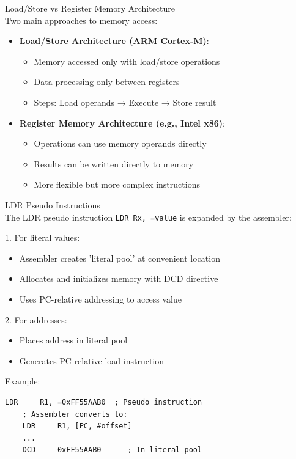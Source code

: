 \begin{concept}{Load/Store vs Register Memory Architecture}\\
Two main approaches to memory access:
\begin{itemize}
  \item \textbf{Load/Store Architecture (ARM Cortex-M)}:
    \begin{itemize}
      \item Memory accessed only with load/store operations
      \item Data processing only between registers
      \item Steps: Load operands → Execute → Store result
    \end{itemize}
  \item \textbf{Register Memory Architecture (e.g., Intel x86)}:
    \begin{itemize}
      \item Operations can use memory operands directly
      \item Results can be written directly to memory
      \item More flexible but more complex instructions
    \end{itemize}
\end{itemize}
\end{concept}

\begin{definition}{LDR Pseudo Instructions}\\
The LDR pseudo instruction \texttt{LDR Rx, =value} is expanded by the assembler:

1. For literal values:
\begin{itemize}
  \item Assembler creates 'literal pool' at convenient location
  \item Allocates and initializes memory with DCD directive
  \item Uses PC-relative addressing to access value
\end{itemize}

2. For addresses:
\begin{itemize}
  \item Places address in literal pool
  \item Generates PC-relative load instruction
\end{itemize}

Example:
\begin{lstlisting}[language=armasm, style=base]
    LDR     R1, =0xFF55AAB0  ; Pseudo instruction
    ; Assembler converts to:
    LDR     R1, [PC, #offset]
    ...
    DCD     0xFF55AAB0      ; In literal pool
\end{lstlisting}
\end{definition}

